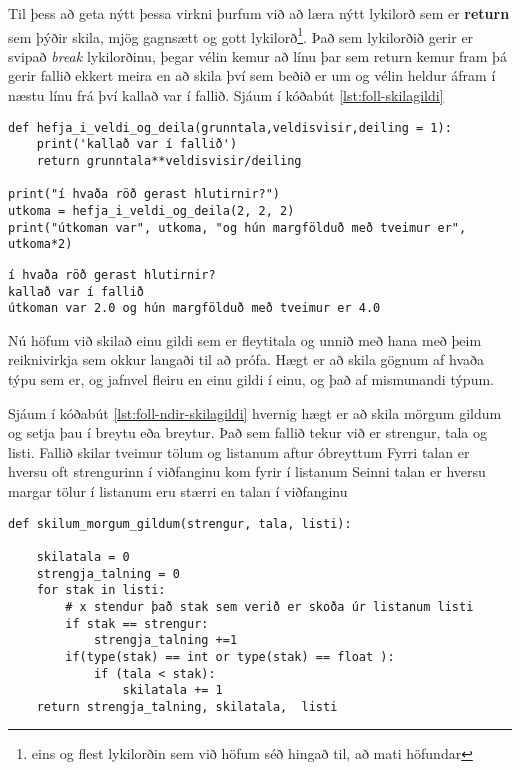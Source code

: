 Til þess að geta nýtt þessa virkni þurfum við að læra nýtt lykilorð sem er \textbf{return} sem þýðir skila, mjög gagnsætt og gott lykilorð\footnote{eins og flest lykilorðin sem við höfum séð hingað til, að mati höfundar}.
Það sem lykilorðið gerir er svipað \emph{break} lykilorðinu, þegar vélin kemur að línu þar sem return kemur fram þá gerir fallið ekkert meira en að skila því sem beðið er um og vélin heldur áfram í næstu línu frá því kallað var í fallið.
Sjáum í kóðabút \ref{lst:foll-skilagildi}

\begin{lstlisting}[caption=Hvernig á að láta fall skila gildi með return skipuninni, label=lst:foll-skilagildi]
def hefja_i_veldi_og_deila(grunntala,veldisvisir,deiling = 1):
	print('kallað var í fallið')
	return grunntala**veldisvisir/deiling
	
print("í hvaða röð gerast hlutirnir?")
utkoma = hefja_i_veldi_og_deila(2, 2, 2)
print("útkoman var", utkoma, "og hún margfölduð með tveimur er", utkoma*2)
\end{lstlisting}
\lstset{style=uttak}
\begin{lstlisting}
í hvaða röð gerast hlutirnir?
kallað var í fallið
útkoman var 2.0 og hún margfölduð með tveimur er 4.0
\end{lstlisting}
\lstset{style=venjulegt}

 
Nú höfum við skilað einu gildi sem er fleytitala og unnið með hana með þeim reiknivirkja sem okkur langaði til að prófa.
Hægt er að skila gögnum af hvaða týpu sem er, og jafnvel fleiru en einu gildi í einu, og það af mismunandi týpum.

Sjáum í kóðabút \ref{lst:foll-ndir-skilagildi} hvernig hægt er að skila mörgum gildum og setja þau í breytu eða breytur.
Það sem fallið tekur við er strengur, tala og listi.
Fallið skilar tveimur tölum og listanum aftur óbreyttum
Fyrri talan er hversu oft strengurinn í viðfanginu kom fyrir í listanum
Seinni talan er hversu margar tölur í listanum eru stærri en talan í viðfanginu


\begin{lstlisting}[caption=Hvernig á að skila mörgum gildum, label=lst:foll-ndir-skilagildi]
def skilum_morgum_gildum(strengur, tala, listi):

	skilatala = 0
	strengja_talning = 0
	for stak in listi:
		# x stendur það stak sem verið er skoða úr listanum listi
		if stak == strengur:
			strengja_talning +=1
		if(type(stak) == int or type(stak) == float ):
			if (tala < stak):
				skilatala += 1
	return strengja_talning, skilatala,  listi
\end{lstlisting}

